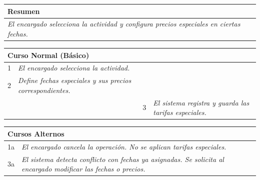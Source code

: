 \begin{table}[H]
    \begin{tabular}{llllllll}
    \hline
    \multicolumn{8}{|l|}{\cellcolor[HTML]{F2F2F2}Resumen} \\ \hline
    \multicolumn{8}{|p{15cm}|}{{\color[HTML]{808080} \textit{El encargado selecciona la actividad y configura precios especiales en ciertas fechas.}}} \\ \hline
    \end{tabular}
\end{table}

\begin{table}[H]
    \begin{tabular}{llllllll}
    \hline
    \multicolumn{8}{|l|}{\cellcolor[HTML]{F2F2F2}Curso Normal (Básico)} \\ \hline
    \multicolumn{1}{|c|}{1} & \multicolumn{1}{p{6cm}|}{{\color[HTML]{808080} \textit{El encargado selecciona la actividad.}}} & \multicolumn{1}{c|}{} & \multicolumn{5}{p{6cm}|}{} \\ \hline
    \multicolumn{1}{|c|}{2} & \multicolumn{1}{p{6cm}|}{{\color[HTML]{808080} \textit{Define fechas especiales y sus precios correspondientes.}}} & \multicolumn{1}{c|}{} & \multicolumn{5}{p{6cm}|}{} \\ \hline
    \multicolumn{1}{|c|}{} & \multicolumn{1}{p{6cm}|}{} & \multicolumn{1}{c|}{3} & \multicolumn{5}{p{6cm}|}{{\color[HTML]{808080} \textit{El sistema registra y guarda las tarifas especiales.}}} \\ \hline
    \end{tabular}
\end{table}

\begin{table}[H]
    \begin{tabular}{llllllll}
    \hline
    \multicolumn{8}{|l|}{\cellcolor[HTML]{F2F2F2}Cursos Alternos} \\ \hline
    \multicolumn{1}{|c|}{1a} & \multicolumn{7}{p{14cm}|}{{\color[HTML]{808080} \textit{El encargado cancela la operación. No se aplican tarifas especiales.}}} \\ \hline
    \multicolumn{1}{|c|}{3a} & \multicolumn{7}{p{14cm}|}{{\color[HTML]{808080} \textit{El sistema detecta conflicto con fechas ya asignadas. Se solicita al encargado modificar las fechas o precios.}}} \\ \hline
    \end{tabular}
\end{table}


